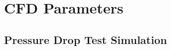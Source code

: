 
\chapter{CFD Parameters}
\label{cap:cfdparameters}

\lipsum[1]

% 


\section{Pressure Drop Test Simulation}
\label{sec:pressuredropsimulation}

\lipsum[1]
